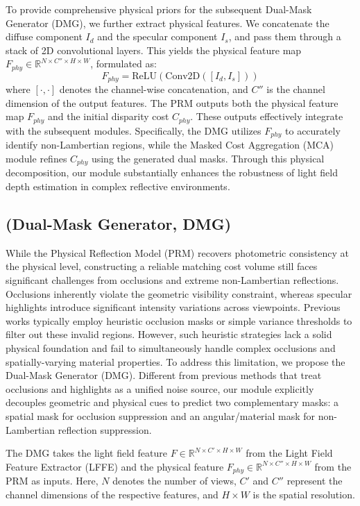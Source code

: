 \documentclass[lettersize,journal]{IEEEtran}
\begin{document}
To provide comprehensive physical priors for the subsequent Dual-Mask Generator (DMG), we further extract physical features. We concatenate the diffuse component $I_d$ and the specular component $I_s$, and pass them through a stack of 2D convolutional layers. This yields the physical feature map $F_{phy} \in \mathbb{R}^{N \times C'' \times H \times W}$, formulated as:
\begin{equation}
\label{eq:eq6}
F_{phy} = \text{ReLU}(\text{Conv2D}([I_d, I_s]))
\end{equation}
where $[\cdot, \cdot]$ denotes the channel-wise concatenation, and $C''$ is the channel dimension of the output features. The PRM outputs both the physical feature map $F_{phy}$ and the initial disparity cost $C_{phy}$. These outputs effectively integrate with the subsequent modules. Specifically, the DMG utilizes $F_{phy}$ to accurately identify non-Lambertian regions, while the Masked Cost Aggregation (MCA) module refines $C_{phy}$ using the generated dual masks. Through this physical decomposition, our module substantially enhances the robustness of light field depth estimation in complex reflective environments.

\subsection{(Dual-Mask Generator, DMG)}

While the Physical Reflection Model (PRM) recovers photometric consistency at the physical level, constructing a reliable matching cost volume still faces significant challenges from occlusions and extreme non-Lambertian reflections. Occlusions inherently violate the geometric visibility constraint, whereas specular highlights introduce significant intensity variations across viewpoints. Previous works typically employ heuristic occlusion masks or simple variance thresholds to filter out these invalid regions. However, such heuristic strategies lack a solid physical foundation and fail to simultaneously handle complex occlusions and spatially-varying material properties. To address this limitation, we propose the Dual-Mask Generator (DMG). Different from previous methods that treat occlusions and highlights as a unified noise source, our module explicitly decouples geometric and physical cues to predict two complementary masks: a spatial mask for occlusion suppression and an angular/material mask for non-Lambertian reflection suppression.

The DMG takes the light field feature $F \in \mathbb{R}^{N \times C' \times H \times W}$ from the Light Field Feature Extractor (LFFE) and the physical feature $F_{phy} \in \mathbb{R}^{N \times C'' \times H \times W}$ from the PRM as inputs. Here, $N$ denotes the number of views, $C'$ and $C''$ represent the channel dimensions of the respective features, and $H \times W$ is the spatial resolution. 
\end{document}
